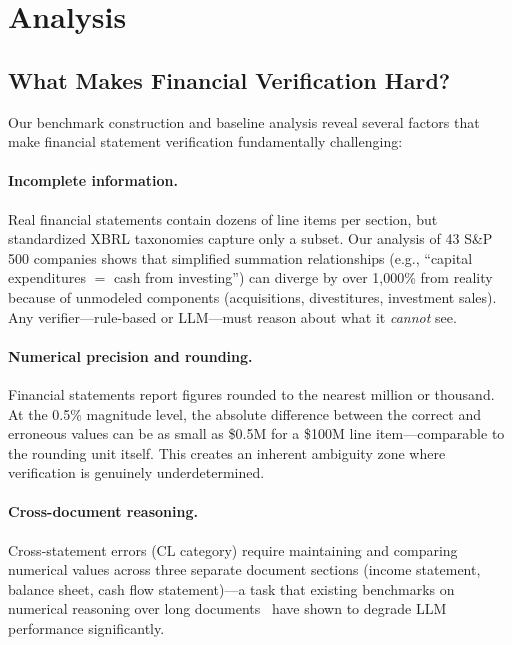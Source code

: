 \documentclass[11pt]{article}
\begin{document}
\section{Analysis}
\label{sec:analysis}

\subsection{What Makes Financial Verification Hard?}
\label{sec:analysis:hard}

Our benchmark construction and baseline analysis reveal several factors that make financial statement verification fundamentally challenging:

\paragraph{Incomplete information.}
Real financial statements contain dozens of line items per section, but standardized XBRL taxonomies capture only a subset.
Our analysis of 43 S\&P 500 companies shows that simplified summation relationships (e.g., ``capital expenditures $=$ cash from investing'') can diverge by over 1,000\% from reality because of unmodeled components (acquisitions, divestitures, investment sales).
Any verifier---rule-based or LLM---must reason about what it \emph{cannot} see.

\paragraph{Numerical precision and rounding.}
Financial statements report figures rounded to the nearest million or thousand.
At the 0.5\% magnitude level, the absolute difference between the correct and erroneous values can be as small as \$0.5M for a \$100M line item---comparable to the rounding unit itself.
This creates an inherent ambiguity zone where verification is genuinely underdetermined.

\paragraph{Cross-document reasoning.}
Cross-statement errors (CL category) require maintaining and comparing numerical values across three separate document sections (income statement, balance sheet, cash flow statement)---a task that existing benchmarks on numerical reasoning over long documents~\citep{zhao2024docmatheval} have shown to degrade LLM performance significantly.
\end{document}
